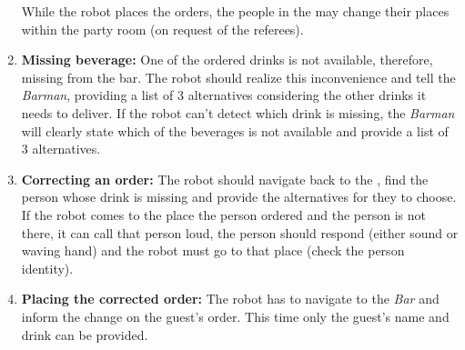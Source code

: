 \begin{enumerate}
	While the robot places the orders, the people in the  may change their places within the party room (on request of the referees).

	\item \textbf{Missing beverage:} One of the ordered drinks is not available, therefore, missing from the bar. The robot should realize this inconvenience and tell the \textit{Barman}, providing a list of 3 alternatives considering the other drinks it needs to deliver. If the robot can't detect which drink is missing, the \textit{Barman} will clearly state which of the beverages is not available and provide a list of 3 alternatives.

	\item \textbf{Correcting an order:} The robot should navigate back to the , find the person whose drink is missing and provide the alternatives for they to choose.\\

	If the robot comes to the place the person ordered and the person is not there, it can call that person loud, the person should respond (either sound or waving hand) and the robot must go to that place (check the person identity).

	\item \textbf{Placing the corrected order:} The robot has to navigate to the \textit{Bar} and inform the change on the guest's order. This time only the guest's name and drink can be provided.
\end{enumerate}

